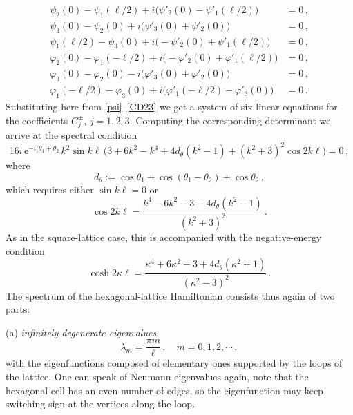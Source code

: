 \documentclass[english]{elsarticle}
\newcommand{\e}{\mathrm{e}}
\begin{document}
\begin{align*}
\psi_2(0) - \psi_1(\ell/2) + i\big(\psi'_2(0) - \psi'_1(\ell/2) \big) &= 0\,, \\
\psi_3(0) - \psi_2(0) + i\big(\psi'_3(0) + \psi'_2(0) \big) &= 0\,, \\
\psi_1(\ell/2) - \psi_3(0) + i\big(-\psi'_2(0) + \psi'_1(\ell/2) \big) &= 0\,, \\
\varphi_2(0) - \varphi_1(-\ell/2) + i\big(-\varphi'_2(0) + \varphi'_1(\ell/2) \big) &= 0\,, \\
\varphi_3(0) - \varphi_2(0) - i\big(\varphi'_3(0) + \varphi'_2(0) \big) &= 0\,, \\
\varphi_1(-\ell/2) - \varphi_3(0) + i\big(\varphi'_1(-\ell/2) - \varphi'_3(0) \big) &= 0\,.
\end{align*}
Substituting here from \eqref{psi}--\eqref{CD23} we get a system of six linear equations for the coefficients $C_j^\pm,\, j=1,2,3$. Computing the corresponding determinant we arrive at the spectral condition
$$
16i\,\e^{-i(\theta_1+\theta_2}\,k^2\sin k\ell\, \Big( 3 + 6k^2 - k^4 +4d_\theta(k^2-1) + (k^2+3)^2 \cos 2k\ell \Big) = 0\,,
$$
where
$$
d_\theta := \cos\theta_1 + \cos(\theta_1-\theta_2) + \cos\theta_2\,,
$$
which requires either $\sin k\ell=0$ or
\begin{equation} \label{hexcondition}
\cos 2k\ell = \frac{k^4 - 6k^2 - 3 - 4d_\theta(k^2-1)}{(k^2+3)^2}\,.
\end{equation}
As in the square-lattice case, this is accompanied with the negative-energy condition
\begin{equation} \label{hexcondition<0}
\cosh 2\kappa\ell = \frac{\kappa^4 + 6\kappa^2 - 3 + 4d_\theta(\kappa^2+1)}{(\kappa^2-3)^2}\,.
\end{equation}
The spectrum of the hexagonal-lattice Hamiltonian consists thus again of two parts:

\medskip

\noindent (a) \emph{infinitely degenerate eigenvalues}
$$
\lambda_m = \frac{\pi m}{\ell}\,,\quad m=0,1,2,\cdots\,,
$$
with the eigenfunctions composed of elementary ones supported by the loops of the lattice. One can speak of Neumann eigenvalues again, note that the hexagonal cell has an even number of edges, so the eigenfunction may keep switching sign at the vertices along the loop.
\end{document}
